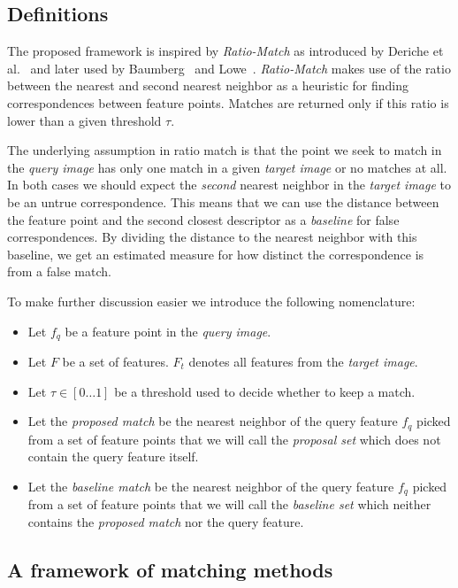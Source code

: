 \documentclass[review]{elsarticle}
\begin{document}
\subsection{Definitions}
%
The proposed framework is inspired by \emph{Ratio-Match} as introduced by Deriche et al.\ \cite{deriche1994robust} and later used by Baumberg~\cite{baumberg2000reliable} and Lowe~\cite{lowe2004sift}. \emph{Ratio-Match} makes use of the ratio between the nearest and second nearest neighbor as a heuristic for finding correspondences between feature points. Matches are returned only if this ratio is lower than a given threshold $\tau$.

The underlying assumption in ratio match is that the point we seek to match in the \emph{query image} has only one match in a given \emph{target image} or no matches at all. In both cases we should expect the \emph{second} nearest neighbor in the \emph{target image} to be an untrue correspondence.  This means that we can use the distance between the feature point and the second closest descriptor as a \emph{baseline} for false correspondences. By dividing the distance to the nearest neighbor with this baseline, we get an estimated measure for how distinct the correspondence is from a false match.  

To make further discussion easier we introduce the following nomenclature:
\begin{itemize}
\item{Let $f_q$ be a feature point in the \emph{query image}}.
\item{Let $F$ be a set of features. $F_{t}$ denotes all
        features from the \emph{target image}}.
\item{Let $\tau \in [0 \ldots 1]$ be a threshold used to decide whether 
    to keep a match.} %
\item{Let the \emph{proposed match} be the nearest neighbor of the query 
    feature $f_q$ picked from a set of feature points that we will call 
the \emph{proposal set} which does not contain the query feature itself}.
\item{Let the \emph{baseline match} be the nearest neighbor of the query 
    feature $f_q$ picked from a set of feature points that we will call 
the \emph{baseline set} which neither contains the \emph{proposed match} 
nor the query feature}.
\end{itemize}

%
\subsection{A framework of matching methods}
%
\end{document}
